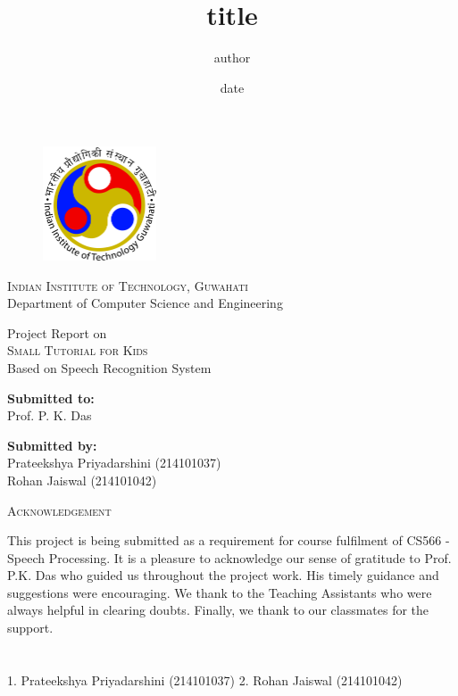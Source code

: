 \documentclass{article}
\begin{document}
\title{title}
\author{author}
\date{date}

\begin{titlepage}
\begin{figure}[t]
    \centering\includegraphics[width=0.3\textwidth]{IITG_logo}
\end{figure}
\begin{center}
    \textsc{ \LARGE{Indian Institute of Technology, Guwahati \\}}
	\textnormal{ \LARGE{Department of Computer Science and Engineering\\ }}
	 
    \textup{Project Report on}\\
	\textsc{ \LARGE{Small Tutorial for Kids\\ }}
	\textup{Based on Speech Recognition System}\\ 
	\vspace{30mm}
	\fontsize{10mm}{7mm}\selectfont
\end{center}

\vspace{25mm}

\begin{minipage}[t]{0.4\textwidth}
	\textnormal{\large{\bf Submitted to:\\}}
	{\large Prof. P. K. Das}
\end{minipage}\hfill
\begin{minipage}[t]{0.6\textwidth}\raggedleft
	\textnormal{\large{\bf Submitted by:\\}}
	{\large Prateekshya Priyadarshini (214101037)\\Rohan Jaiswal (214101042)}
\end{minipage}

\vspace{20mm}
\end{titlepage}
\begin{center}
    \textsc{ \LARGE{Acknowledgement \\}}
\end{center}
This project is being submitted as a requirement for course fulfilment of CS566 - Speech Processing. It is a pleasure to acknowledge our sense of gratitude to Prof. P.K. Das who guided us throughout the project work. His timely guidance and suggestions were encouraging. We thank to the Teaching Assistants who were always helpful in clearing doubts. Finally, we thank to our classmates for the support.\\\\\\
1. Prateekshya Priyadarshini (214101037) 2. Rohan Jaiswal (214101042)
\newpage
\tableofcontents
\newpage
\listoffigures
\newpage
\end{document}
